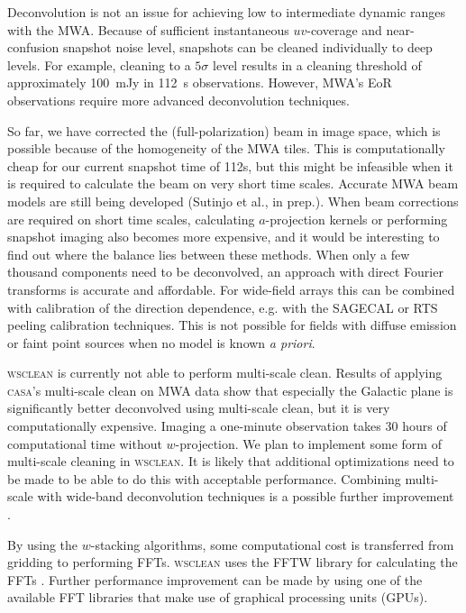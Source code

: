 \documentclass[useAMS,usenatbib]{mn2e}
\begin{document}
Deconvolution is not an issue for achieving low to intermediate dynamic ranges with the MWA. Because of sufficient instantaneous $uv$-coverage and near-confusion snapshot noise level, snapshots can be cleaned individually to deep levels. For example, cleaning to a $5\sigma$ level results in a cleaning threshold of approximately 100~mJy in 112~s observations. However, MWA's EoR observations \citep{bowman-science-with-the-mwa-2013} require more advanced deconvolution techniques.

So far, we have corrected the (full-polarization) beam in image space, which is possible because of the homogeneity of the MWA tiles. This is computationally cheap for our current snapshot time of 112s, but this might be infeasible when it is required to calculate the beam on very short time scales. Accurate MWA beam models are still being developed (Sutinjo et al., in prep.). When beam corrections are required on short time scales, calculating $a$-projection kernels or performing snapshot imaging also becomes more expensive, and it would be interesting to find out where the balance lies between these methods. When only a few thousand components need to be deconvolved, an approach with direct Fourier transforms is accurate and affordable. For wide-field arrays this can be combined with calibration of the direction dependence, e.g. with the SAGECAL \citep{sage-calibration-ii} or RTS peeling \citep{rts-mwa} calibration techniques. This is not possible for fields with diffuse emission or faint point sources when no model is known \textit{a priori}.

\textsc{wsclean} is currently not able to perform multi-scale clean. Results of applying \textsc{casa}'s multi-scale clean \citep{multiscale-clean-cornwell-2008} on MWA data show that especially the Galactic plane is significantly better deconvolved using multi-scale clean, but it is very computationally expensive. Imaging a one-minute observation takes 30 hours of computational time without $w$-projection. We plan to implement some form of multi-scale cleaning in \textsc{wsclean}. It is likely that additional optimizations need to be made to be able to do this with acceptable performance. Combining multi-scale with wide-band deconvolution techniques is a possible further improvement \citep{rau-msmfs-2011}.

By using the $w$-stacking algorithms, some computational cost is transferred from gridding to performing FFTs. \textsc{wsclean} uses the FFTW library for calculating the FFTs \citep{fftw-2005}. Further performance improvement can be made by using one of the available FFT libraries that make use of graphical processing units (GPUs).
\end{document}
